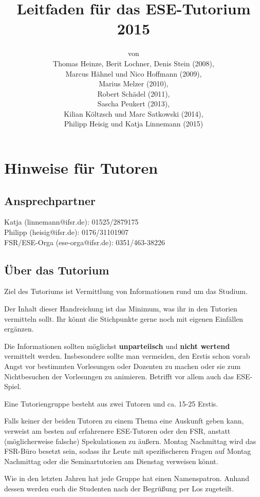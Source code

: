 \documentclass[a4paper,12pt]{report}
\begin{document}
\title{\textbf{Leitfaden für das ESE-Tutorium 2015}\\}
\date{}
\author{von\\Thomas Heinze, Berit Lochner, Denis Stein (2008), \\Marcus Hähnel und Nico Hoffmann (2009), \\Marius Melzer (2010), \\Robert Schädel (2011),\\Sascha Peukert (2013), \\Kilian Költzsch und Marc Satkowski (2014), \\Philipp Heisig und Katja Linnemann (2015)}
\maketitle

\chapter{Hinweise für Tutoren}
\section{Ansprechpartner}
Katja (linnemann@ifsr.de): 01525/2879175\\
Philipp (heisig@ifsr.de): 0176/31101907 \\
FSR/ESE-Orga (ese-orga@ifsr.de): 0351/463-38226

\section{Über das Tutorium}
\begin{itemize*}
\item Ziel des Tutoriums ist Vermittlung von Informationen rund um das Studium.
\item Der Inhalt dieser Handreichung ist das Minimum, was ihr in den Tutorien vermitteln sollt.
Ihr könnt die Stichpunkte gerne noch mit eigenen Einfällen ergänzen.
\item Die Informationen sollten möglichst \textbf{unparteiisch} und \textbf{nicht wertend} vermittelt werden.
Insbesondere sollte man vermeiden, den Erstis schon vorab Angst vor bestimmten Vorlesungen oder Dozenten zu machen oder sie zum Nichtbesuchen der Vorlesungen zu animieren.
Betrifft vor allem auch das ESE-Spiel.
\item Eine Tutoriengruppe besteht aus zwei Tutoren und ca. 15-25 Erstis.
\item Falls keiner der beiden Tutoren zu einem Thema eine Auskunft geben kann, verweist am besten auf erfahrenere ESE-Tutoren oder den FSR, anstatt (möglicherweise falsche) Spekulationen zu äußern.
Montag Nachmittag wird das FSR-Büro besetzt sein, sodass ihr Leute mit spezifischeren Fragen auf Montag Nachmittag oder die Seminartutorien am Dienstag verweisen könnt.
\item Wie in den letzten Jahren hat jede Gruppe hat einen Namenspatron.
Anhand dessen werden euch die Studenten nach der Begrüßung per Los zugeteilt.
\end{itemize*}
\end{document}
